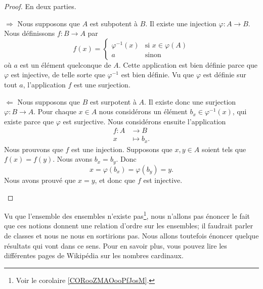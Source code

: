 \begin{proof}
    En deux parties.
    \begin{subproof}
        \item[\( \Rightarrow\)]
            Nous supposons que \( A\) est subpotent à \( B\). Il existe une injection \( \varphi\colon A\to B\). Nous définissons \( f\colon B\to A\) par
            \begin{equation}
                f(x)=\begin{cases}
                    \varphi^{-1}(x)    &   \text{si } x\in\varphi(A)\\
                    a    &    \text{sinon } 
                \end{cases}
            \end{equation}
            où \( a\) est un élément quelconque de \( A\). Cette application est bien définie parce que \( \varphi\) est injective, de telle sorte que \( \varphi^{-1}\) est bien définie. Vu que \( \varphi\) est définie sur tout \( a\), l'application \( f\) est une surjection.
        \item[\( \Leftarrow\)]
            Nous supposons que \( B\) est surpotent à \( A\). Il existe donc une surjection \( \varphi\colon B\to A\). Pour chaque \( x\in A\) nous considérons un élément \( b_x\in \varphi^{-1}(x)\), qui existe parce que \( \varphi\) est surjective. Nous considérons ensuite l'application
            \begin{equation}
                \begin{aligned}
                    f\colon A&\to B \\
                    x&\mapsto b_x. 
                \end{aligned}
            \end{equation}
            Nous prouvons que \( f\) est une injection. Supposons que \( x,y\in A\) soient tels que \( f(x)=f(y)\). Nous avons \( b_x=b_y\). Donc
            \begin{equation}
                x=\varphi(b_x)=\varphi(b_y)=y.
            \end{equation}
            Nous avons prouvé que \( x=y\), et donc que \( f\) est injective.
    \end{subproof}
\end{proof}

Vu que l'ensemble des ensembles n'existe pas\footnote{Voir le corolaire \ref{CORooZMAOooPfJosM}.}, nous n'allons pas énoncer le fait que ces notions donnent une relation d'ordre sur les ensembles; il faudrait parler de classes et nous ne nous en sortirions pas. Nous allons toutefois énoncer quelque résultats qui vont dans ce sens. Pour en savoir plus, vous pouvez lire les différentes pages de Wikipédia sur les nombres cardinaux.

